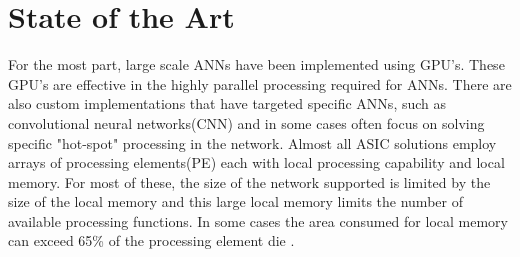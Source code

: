 
\section{State of the Art}
\label{chap-two}

For the most part, large scale ANNs have been implemented using GPU's.
These GPU's are effective in the highly parallel processing required for ANNs.
There are also custom implementations that have targeted specific ANNs\cite{chen201614}\cite{farabet2011neuflow}, 
such as convolutional neural networks(CNN) and in some cases often focus on
solving specific "hot-spot" processing in the network\cite{chen201614}.
Almost all ASIC solutions employ arrays of processing elements(PE) each with local processing capability and local memory.
For most of these, the size of the network supported is limited by the size of the local memory and this large
local memory limits the number of available processing functions. %
In some cases the area consumed for local memory can exceed 65\% of the 
processing element die \cite{kim2016neurocube}\cite{chen2014diannao}.
